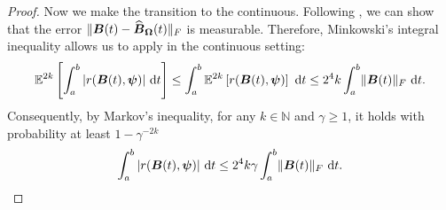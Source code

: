 \documentclass[12pt]{article}
\begin{document}
\begin{proof}
    Now we make the transition to the continuous. Following \cite{kressner-2023-randomized-lowrank}, we can show that the error $\lVert \boldsymbol{B}(t) - \widehat{\boldsymbol{B}}_{\boldsymbol{\Omega}}(t) \rVert _F$ is measurable. Therefore, Minkowski's integral inequality \cite[theorem 202]{hardy-1952-inequalities} allows us to apply  in the continuous setting: 
    \begin{equation}
        \mathbb{E}^{2 k}\left[ \int_{a}^{b} |r(\boldsymbol{B}(t), \boldsymbol{\psi})|~\mathrm{d}t  \right]
        \leq \int_{a}^{b} \mathbb{E}^{2 k}\left[ r(\boldsymbol{B}(t), \boldsymbol{\psi}) \right]~\mathrm{d}t
        \leq 2^4 k \int_{a}^{b} \lVert \boldsymbol{B}(t) \rVert _F~\mathrm{d}t.
    \end{equation}
    Consequently, by Markov's inequality, for any $k \in \mathbb{N}$ and $\gamma \geq 1$, it holds with probability at least $1 - \gamma^{-2 k}$
    \begin{equation}
        \int_{a}^{b} |r(\boldsymbol{B}(t), \boldsymbol{\psi})|~\mathrm{d}t \leq 2^4 k \gamma \int_{a}^{b} \lVert \boldsymbol{B}(t) \rVert _F~\mathrm{d}t.
        \label{equ:hutchinson-trace-onequery-uniform}
    \end{equation}


\end{proof}
\end{document}
